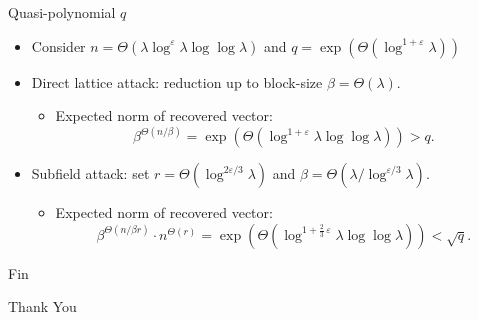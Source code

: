 \documentclass[presentation,smaller]{beamer}
\begin{document}
\begin{frame}[label={sec:org007a0c9}]{Quasi-polynomial \(q\)}
\begin{itemize}[<+->]
\item Consider \(n = \Theta\left( λ \log^ε λ \log\log λ \right)\) and \(q = \exp(\Theta({\log^{1+ε} λ}))\)

\item \alert{Direct lattice attack}: reduction up to block-size \(\beta = \Theta(λ)\).

\begin{itemize}
\item Expected norm of recovered vector: \[β^{\Theta(n/β)} = \exp\left(\Theta\left( \log^{1+ε}λ \log\log λ \right)\right) > q.\]
\end{itemize}

\item \alert{Subfield attack}: set \(r = Θ(\log^{2ε/3} λ)\) and \(β = Θ(λ / \log^{ε/3} λ)\).

\begin{itemize}
\item Expected norm of recovered vector:  \[ β^{Θ(n/β r)} \cdot n^{Θ(r)} = \exp\left(Θ\left(\log^{1+ \frac{2}{3}\,ε}{λ} \log\log λ\right) \right) < \sqrt q.\]
\end{itemize}
\end{itemize}
\end{frame}

\begin{frame}[standout,label={sec:orgdba90d0}]{Fin}
\begin{center}
\alert{Thank You}
\end{center}
\end{frame}
\end{document}
